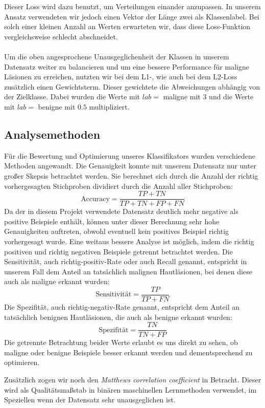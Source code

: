 	Dieser Loss wird dazu benutzt, um Verteilungen einander anzupassen. In unserem Ansatz verwendeten wir jedoch einen Vektor der Länge zwei als Klassenlabel. Bei solch einer kleinen Anzahl an Werten erwarteten wir, dass diese Loss-Funktion vergleichsweise schlecht abschneidet.
\\
\\
Um die oben angesprochene Unausgeglichenheit der Klassen in unserem Datensatz weiter zu balancieren und um eine bessere Performance für maligne Läsionen zu erreichen, nutzten wir bei dem L1-, wie auch bei dem L2-Loss zusätzlich einen Gewichtsterm. Dieser gewichtete die Abweichungen abhängig von der Zielklasse. Dabei wurden die Werte mit $lab=$ maligne mit $3$ und die Werte mit $lab=$ benigne mit $0.5$ multipliziert. 
	  

\subsection{Analysemethoden}
\label{analysemethoden}

Für die Bewertung und Optimierung unseres Klassifikators wurden verschiedene Methoden angewandt. Die Genauigkeit konnte mit unserem Datensatz nur unter großer Skepsis betrachtet werden. Sie berechnet sich durch die Anzahl der richtig vorhergesagten Stichproben dividiert durch die Anzahl aller Stichproben:
	\[\text{Accuracy} = \frac{TP+TN}{TP+TN+FP+FN}\]
Da der in diesem Projekt verwendete Datensatz deutlich mehr negative als positive Beispiele enthält, können unter dieser Berechnung sehr hohe Genauigkeiten auftreten, obwohl eventuell kein positives Beispiel richtig vorhergesagt wurde.
Eine weitaus bessere Analyse ist möglich, indem die richtig positiven und richtig negativen Beispiele getrennt betrachtet werden. Die Sensitivität, auch richtig-positiv-Rate oder auch Recall genannt, entspricht in unserem Fall dem Anteil an tatsächlich malignen Hautläsionen, bei denen diese auch als maligne erkannt wurden:
\[\text{Sensitivität} = \frac{TP}{TP+FN}\]
Die Spezifität, auch richtig-negativ-Rate genannt, entspricht dem Anteil an tatsächlich benignen Hautläsionen, die auch als benigne erkannt wurden:
\[\text{Spezifität} = \frac{TN}{TN+FP}\]
Die getrennte Betrachtung beider Werte erlaubt es uns direkt zu sehen, ob maligne oder benigne Beispiele besser erkannt werden und dementsprechend zu optimieren.

Zusätzlich zogen wir noch den \textit{Matthews correlation coefficient} in Betracht. Dieser wird als Qualitätsmaßstab in binären maschinellen Lernmethoden verwendet, im Speziellen wenn der Datensatz sehr unausgeglichen ist. 

